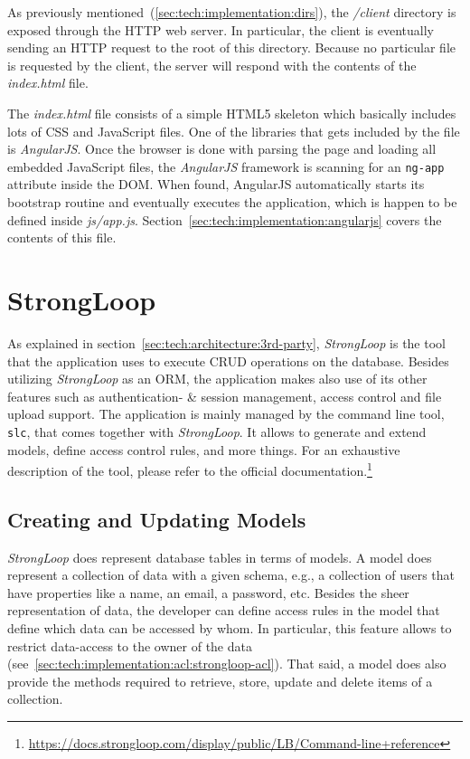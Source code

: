 \documentclass[nochapterpage,nopartpage,noheadingspace,numbersubsubsec,bigchapter,colorback,accentcolor=tud9c,10pt]{tudreport}
\begin{document}
    As previously mentioned~(\ref{sec:tech:implementation:dirs}), the \emph{/client} directory is exposed through the HTTP web server. In particular, the client is eventually sending an HTTP request to the root of this directory. Because no particular file is requested by the client, the server will respond with the contents of the \emph{index.html} file.

    The \emph{index.html} file consists of a simple HTML5 skeleton which basically includes lots of CSS and JavaScript files. One of the libraries that gets included by the file is \emph{AngularJS}. Once the browser is done with parsing the page and loading all embedded JavaScript files, the \emph{AngularJS} framework is scanning for an \texttt{ng-app} attribute inside the DOM. When found, AngularJS automatically starts its bootstrap routine and eventually executes the application, which is happen to be defined inside \emph{js/app.js}. Section~\ref{sec:tech:implementation:angularjs} covers the contents of this file.

  \section{StrongLoop}
  \label{sec:tech:implementation:strongloop}

    As explained in section~\ref{sec:tech:architecture:3rd-party}, \emph{StrongLoop} is the tool that the application uses to execute CRUD operations on the database. Besides utilizing \emph{StrongLoop} as an ORM, the application makes also use of its other features such as authentication- \& session management, access control and file upload support. The application is mainly managed by the command line tool, \texttt{slc}, that comes together with \emph{StrongLoop}. It allows to generate and extend models, define access control rules, and more things. For an exhaustive description of the tool, please refer to the official documentation.\footnote{\url{https://docs.strongloop.com/display/public/LB/Command-line+reference}}

  \subsection{Creating and Updating Models}
  \label{sec:tech:implementation:strongloop:models}

    \emph{StrongLoop} does represent database tables in terms of models. A model does represent a collection of data with a given schema, e.g., a collection of users that have properties like a name, an email, a password, etc. Besides the sheer representation of data, the developer can define access rules in the model that define which data can be accessed by whom. In particular, this feature allows to restrict data-access to the owner of the data (see~\ref{sec:tech:implementation:acl:strongloop-acl}). That said, a model does also provide the methods required to retrieve, store, update and delete items of a collection.
\end{document}
